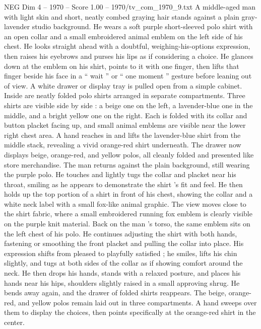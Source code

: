 \begin{textsample}{NEG Dim 4 – 1970 – Score 1.00 – 1970/tv\_com\_1970\_9.txt}  \label{ex:f4_neg_011}
A middle-aged man with light skin and short, neatly combed graying hair stands against a plain gray-lavender studio background.
He wears a soft purple short-sleeved polo shirt with an open collar and a small embroidered animal emblem on the left side of his chest.
He looks straight ahead with a doubtful, weighing-his-options expression, then raises his eyebrows and purses his lips as if considering a choice.
He glances down at the emblem on his shirt, points to it with one finger, then lifts that finger beside his face in a “ wait ” or “ one moment ” gesture before leaning out of view.
A white drawer or display tray is pulled open from a simple cabinet.
Inside are neatly folded polo shirts arranged in separate compartments.
Three shirts are visible side by side : a beige one on the left, a lavender-blue one in the middle, and a bright yellow one on the right.
Each is folded with its collar and button placket facing up, and small animal emblems are visible near the lower right chest area.
A hand reaches in and lifts the lavender-blue shirt from the middle stack, revealing a vivid orange-red shirt underneath.
The drawer now displays beige, orange-red, and yellow polos, all cleanly folded and presented like store merchandise.
The man returns against the plain background, still wearing the purple polo.
He touches and lightly tugs the collar and placket near his throat, smiling as he appears to demonstrate the shirt ’s fit and feel.
He then holds up the top portion of a shirt in front of his chest, showing the collar and a white neck label with a small fox-like animal graphic.
The view moves close to the shirt fabric, where a small embroidered running fox emblem is clearly visible on the purple knit material.
Back on the man ’s torso, the same emblem sits on the left chest of his polo.
He continues adjusting the shirt with both hands, fastening or smoothing the front placket and pulling the collar into place.
His expression shifts from pleased to playfully satisfied ; he smiles, lifts his chin slightly, and tugs at both sides of the collar as if showing comfort around the neck.
He then drops his hands, stands with a relaxed posture, and places his hands near his hips, shoulders slightly raised in a small approving shrug.
He bends away again, and the drawer of folded shirts reappears.
The beige, orange-red, and yellow polos remain laid out in three compartments.
A hand sweeps over them to display the choices, then points specifically at the orange-red shirt in the center.

\end{textsample}
